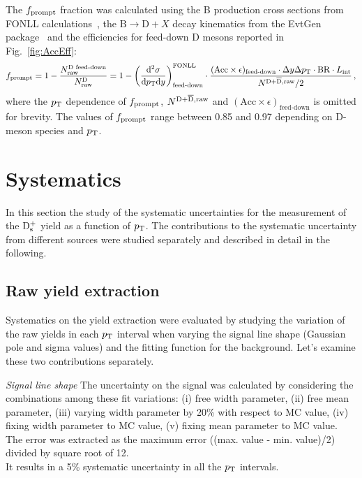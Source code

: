 The $f_{\rm prompt}$ fraction was calculated using the B production cross sections from  
FONLL calculations~\cite{Cacciari:1998it, Cacciari:2001td}, the 
$\mathrm{B} \rightarrow \mathrm{D} + X$ decay kinematics from the EvtGen package~\cite{Lange:2001uf} 
and the efficiencies for feed-down D mesons reported in 
Fig.~\ref{fig:AccEff}:
\begin{equation}
\label{eq:fpr}
f_{\mathrm{prompt}} =1- \frac{N^{\text{D~feed-down}}_{\mathrm{raw}}}{N^{\mathrm{D}}_{\mathrm{raw}}}= 1- \left (\frac{\rm d^2 \sigma}{\mathrm dp_{\rm T} \mathrm d y} \right)^{\rm FONLL}_{\text{feed-down}} \cdot \frac{(\mathrm{Acc} \times \epsilon)_\text{feed-down} \cdot \Delta y \Delta p_{\rm T} \cdot \mathrm{BR} \cdot L_{\rm int}}{N^{\rm D +\overline{D},raw}/2}\,,
\end{equation}
where the $p_{\rm T}$ dependence of $f_{\rm prompt}$, $N^{\rm D +\overline{D},raw}$ and
$(\mathrm{Acc} \times \epsilon)_\text{feed-down}$ is omitted for brevity.
The values of $f_{\rm prompt}$ range between 0.85 and 0.97 depending on 
D-meson species and $p_{\rm T}$.



\section{Systematics}
In this section the study of the systematic uncertainties for the
 measurement of the ${\rm D_s^+}$ yield as a function of $p_{\rm T}$. 
 The contributions to the systematic uncertainty from different 
 sources were studied separately and described in detail in the following.

\subsection{Raw yield extraction}
Systematics on the yield extraction were evaluated by studying 
the variation of the raw yields in each $p_{\rm T}$ interval when 
varying the signal line shape
(Gaussian pole and sigma values) and the fitting function for the 
background. Let's examine these two contributions separately.

\emph{Signal line shape}
The uncertainty on the signal was calculated by considering the combinations among these fit
variations: (i) free width parameter, (ii) free mean parameter, (iii) varying width parameter
by 20\% with respect to MC value, (iv) fixing width parameter to MC value, (v) fixing mean parameter to MC value.
The error was extracted as the maximum error ((max. value - min. value)/2) divided by square root of 12.\\
It results in a 5\% systematic uncertainty in all the $p_{\rm T}$ intervals.

